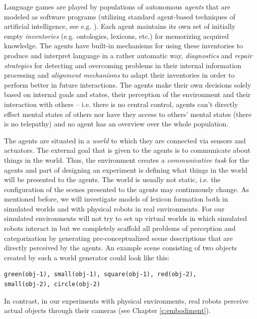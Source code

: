 Language games are played by populations of autonomous \emph{agents}
that are modeled as software programs (utilizing standard agent-based
techniques of artificial intelligence, see
e.g. \citealp{wooldridge95intelligent,russel95artificial}). Each agent
maintains its own set of initially empty \emph{inventories}
(e.g. ontologies, lexicons, etc.) for memorizing acquired
knowledge. The agents have built-in mechanisms for using these
inventories to produce and interpret language in a rather automatic
way, \emph{diagnostics} and \emph{repair strategies} for detecting and
overcoming problems in their internal information processing and
\emph{alignment mechanisms} to adapt their inventories in order to
perform better in future interactions. The agents make their own
decisions solely based on internal goals and states, their perception
of the environment and their interaction with others -- i.e. there is
no central control, agents can't directly effect mental states of
others nor have they access to others' mental states (there is no
telepathy) and no agent has an overview over the whole population.

The agents are situated in a \emph{world} to which they are connected
via sensors and actuators. The external goal that is given to the
agents is to communicate about things in the world. Thus, the
environment creates a \emph{communicative task} for the agents and
part of designing an experiment is defining what things in the world
will be presented to the agents. The world is usually not static,
i.e. the configuration of the scenes presented to the agents may
continuously change. As mentioned before, we will investigate models
of lexicon formation both in simulated worlds and with physical robots
in real environments. For our simulated environments will not try to
set up virtual worlds in which simulated robots interact in but we
completely scaffold all problems of perception and categorization by
generating pre-conceptualized scene descriptions that are directly
perceived by the agents. An example scene consisting of two objects
created by such a world generator could look like this: 

\begin{verbatim}
green(obj-1), small(obj-1), square(obj-1), red(obj-2), 
small(obj-2), circle(obj-2)
\end{verbatim}

\noindent In contrast, in our experiments with physical environments,
real robots perceive actual objects through their cameras (see Chapter
\ref{c:embodiment}).


